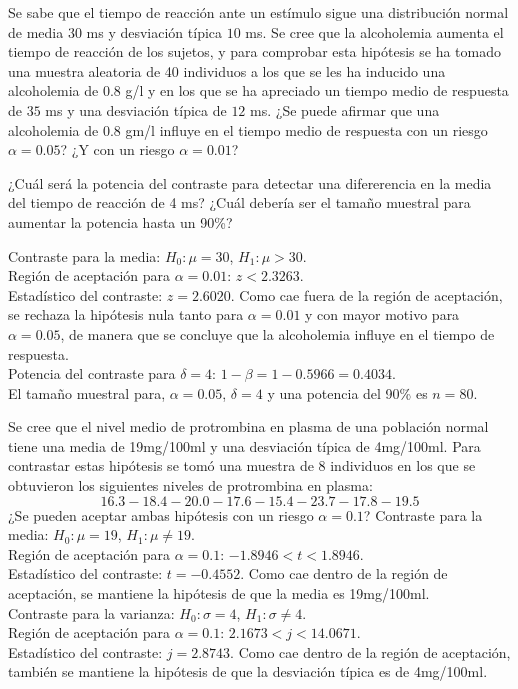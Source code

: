 {Se sabe que el tiempo de reacción ante un estímulo sigue una distribución normal de media $30$ ms y desviación típica
$10$ ms.
Se cree que la alcoholemia aumenta el tiempo de reacción de los sujetos, y para comprobar esta hipótesis se ha tomado
una muestra aleatoria de 40 individuos a los que se les ha inducido una alcoholemia de $0.8$ g/l y en los que se ha
apreciado un tiempo medio de respuesta de $35$ ms y una desviación típica de $12$ ms.
¿Se puede afirmar que una alcoholemia de $0.8$ gm/l influye en el tiempo medio de respuesta con un riesgo
$\alpha=0.05$? ¿Y con un riesgo $\alpha=0.01$?

¿Cuál será la potencia del contraste para detectar una difererencia en la media del tiempo de reacción de 4 ms? ¿Cuál
debería ser el tamaño muestral para aumentar la potencia hasta un 90\%?
}
{Contraste para la media: $H_0: \mu=30$, $H_1:\mu>30$.\\
Región de aceptación para $\alpha=0.01$: $z<2.3263$.\\
Estadístico del contraste: $z=2.6020$. Como cae fuera de la región de aceptación, se rechaza la hipótesis nula
tanto para $\alpha=0.01$ y con mayor motivo para $\alpha=0.05$, de manera que se concluye que la alcoholemia influye en
el tiempo de respuesta.\\
Potencia del contraste  para $\delta=4$: $1-\beta=1-0.5966=0.4034$.\\
El tamaño muestral para, $\alpha=0.05$, $\delta=4$ y una potencia del 90\% es $n=80$.  
}
{}


{Se cree que el nivel medio de protrombina en plasma de una población normal tiene una media de 19mg/100ml y una
desviación típica de 4mg/100ml.
Para contrastar estas hipótesis se tomó una muestra de 8 individuos en los que se obtuvieron los siguientes niveles de
protrombina en plasma:
\[
16.3 - 18.4 - 20.0 - 17.6 - 15.4 - 23.7 - 17.8 - 19.5
\]
¿Se pueden aceptar ambas hipótesis con un riesgo $\alpha=0.1$?
}
{Contraste para la media: $H_0:\mu=19$, $H_1:\mu\neq 19$.\\
Región de aceptación para $\alpha=0.1$: $-1.8946<t<1.8946$.\\
Estadístico del contraste: $t=-0.4552$. Como cae dentro de la región de aceptación, se mantiene la hipótesis de
que la media es 19mg/100ml.\\
Contraste para la varianza: $H_0:\sigma=4$, $H_1:\sigma\neq 4$.\\
Región de aceptación para $\alpha=0.1$: $2.1673<j<14.0671$.\\
Estadístico del contraste: $j=2.8743$. Como cae dentro de la región de aceptación, también se mantiene la hipótesis
de que la desviación típica es de 4mg/100ml.
}
{}


